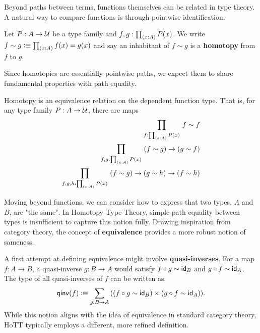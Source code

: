 \documentclass[main.tex]{subfiles}
\begin{document}
Beyond paths between terms, functions themselves can be related in type theory. A natural way to compare functions is through pointwise identification.
\begin{definition}
    Let $P : A \to \mathcal{U}$ be a type family and $f,g : \prd{x : A}P(x)$. We write
    $f\sim g \defeq \prd{x : A} f(x) = g(x) $
    and say an inhabitant of $f \sim g$ is a \textbf{homotopy} from $f$ to $g$.
\end{definition}
Since homotopies are essentially pointwise paths, we expect them to share fundamental properties with path equality.

\begin{lemma}
    Homotopy is an equivalence relation on the dependent function type. That is, for any type family $P : A \to \mathcal{U}$, there are maps
    \begin{align*}
        \prd{f : \prd{x : A}P(x)} f \sim f\\
        \prd{f,g : \prd{x:A}P(x)} \left ( f \sim g \right ) \to \left ( g \sim f \right )\\
        \prd{f,g,h : \prd{x : A} P(x)} \left ( f \sim g \right ) \to \left ( g \sim h \right ) \to \left (f \sim h\right )
    \end{align*}
\end{lemma}
Moving beyond functions, we can consider how to express that two types, $A$ and $B$, are "the same". In Homotopy Type Theory, simple path equality between types is insufficient to capture this notion fully. Drawing inspiration from category theory, the concept of \textbf{equivalence} provides a more robust notion of sameness.

A first attempt at defining equivalence might involve \textbf{quasi-inverses}. For a map $f : A \to B$, a quasi-inverse $g : B \to A$ would satisfy $f\circ g \sim \mathsf{id}_{B}$ and $g \circ f \sim \mathsf{id}_{A}$. The type of all quasi-inverses of $f$ can be written as:
\[
    \qinv(f) \defeq \sm{g : B \to A}((f\circ g \sim \id{B})\times(g \circ f \sim \id{A})).
\]    
While this notion aligns with the idea of equivalence in standard category theory, HoTT typically employs a different, more refined definition.
\end{document}
